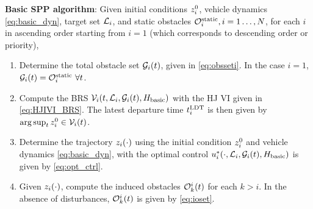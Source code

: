 \begin{alg}
\label{alg:basic}
\textbf{Basic SPP algorithm}: Given initial conditions $z_i^0$, vehicle dynamics \eqref{eq:basic_dyn}, target set $\mathcal{L}_i$, and static obstacles $\mathcal{O}^\text{static}_i, i = 1\ldots, N$, for each $i$ in ascending order starting from $i=1$ (which corresponds to descending order or priority),
\begin{enumerate}
\item Determine the total obstacle set $\mathcal{G}_i(t)$, given in \eqref{eq:obsseti}. In the case $i=1$, $\mathcal{G}_i(t) = \mathcal{O}^\text{static}_i ~ \forall t$.
\item Compute the BRS $\mathcal{V}_i(t, \mathcal{L}_i, \mathcal{G}_i(t), H_\text{basic})$ with the HJ VI given in  \eqref{eq:HJIVI_BRS}. The latest departure time $t^\text{LDT}_i$ is then given by $\arg \sup_t z^0_i \in \mathcal{V}_i(t)$.
\item Determine the trajectory $z_i(\cdot)$ using the initial condition $z_i^0$ and vehicle dynamics \eqref{eq:basic_dyn}, with the optimal control  $u_i^*(\cdot, \mathcal{L}_i, \mathcal{G}_i(t), H_\text{basic})$ is given by \eqref{eq:opt_ctrl}.
\item Given $z_i(\cdot)$, compute the induced obstacles $\mathcal{O}_k^i(t)$ for each $k>i$. In the absence of disturbances, $\mathcal{O}_k^i(t)$ is given by \eqref{eq:ioset}.
\end{enumerate}
\end{alg}